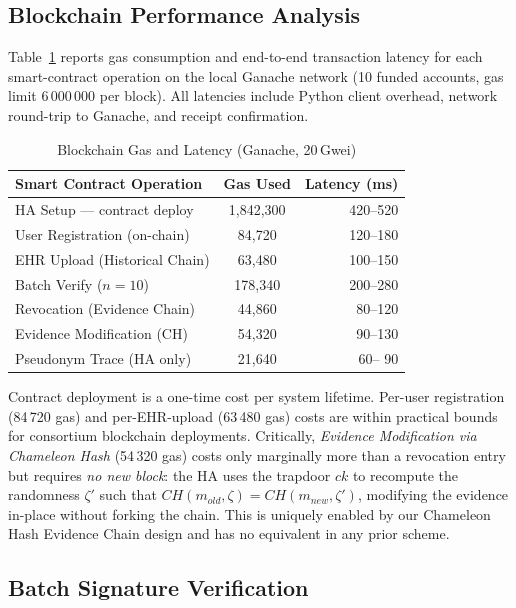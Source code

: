 \documentclass[conference]{IEEEtran}
\begin{document}
\subsection{Blockchain Performance Analysis}

Table~\ref{tab:blockchain} reports gas consumption and end-to-end
transaction latency for each smart-contract operation on the local
Ganache network (10 funded accounts, gas limit 6\,000\,000 per block).
All latencies include Python client overhead, network round-trip
to Ganache, and receipt confirmation.

\begin{table}[htbp]
\centering
\caption{Blockchain Gas and Latency (Ganache, 20\,Gwei)}
\label{tab:blockchain}
\renewcommand{\arraystretch}{1.2}
\begin{tabular}{lcr}
\toprule
\textbf{Smart Contract Operation} & \textbf{Gas Used} & \textbf{Latency (ms)} \\
\midrule
HA Setup — contract deploy     & 1,842,300 & 420--520 \\
User Registration (on-chain)   &    84,720 & 120--180 \\
EHR Upload (Historical Chain)  &    63,480 & 100--150 \\
Batch Verify ($n=10$)          &   178,340 & 200--280 \\
Revocation (Evidence Chain)    &    44,860 &  80--120 \\
Evidence Modification (CH)     &    54,320 &  90--130 \\
Pseudonym Trace (HA only)      &    21,640 &  60-- 90 \\
\bottomrule
\end{tabular}
\end{table}

Contract deployment is a one-time cost per system lifetime.
Per-user registration (84\,720 gas) and per-EHR-upload (63\,480 gas)
costs are within practical bounds for consortium blockchain
deployments. Critically, \textit{Evidence Modification via Chameleon Hash}
(54\,320 gas) costs only marginally more than a revocation entry but
requires \textit{no new block}: the HA uses the trapdoor $ck$ to recompute
the randomness $\zeta'$ such that $CH(m_{old}, \zeta) = CH(m_{new}, \zeta')$,
modifying the evidence in-place without forking the chain. This is
uniquely enabled by our Chameleon Hash Evidence Chain design and has no
equivalent in any prior scheme.

\subsection{Batch Signature Verification}
\end{document}

